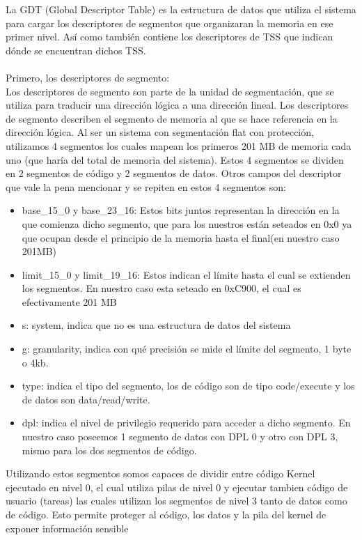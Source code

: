 La GDT (Global Descriptor Table) es la estructura de datos que utiliza el sistema para cargar los descriptores de segmentos que organizaran la memoria en ese primer nivel.
Así como también contiene los descriptores de TSS que indican dónde se encuentran dichos TSS.
\\\\
Primero, los descriptores de segmento: \\
Los descriptores de segmento son parte de la unidad de segmentación, que se utiliza para traducir una dirección lógica a una dirección lineal. Los descriptores de segmento describen el segmento de memoria al que se hace referencia en la dirección lógica.
Al ser un sistema con segmentación flat con protección, utilizamos 4 segmentos los cuales mapean los primeros 201 MB de memoria cada uno (que haría del total de memoria del sistema).
Estos 4 segmentos se dividen en 2 segmentos de código y 2 segmentos de datos.
Otros campos del descriptor que vale la pena mencionar y se repiten en estos 4 segmentos son:
\begin{itemize}
   \item base_15_0 y base_23_16: Estos bits juntos representan la dirección en la que comienza dicho segmento, que para los nuestros están seteados en 0x0 ya que ocupan desde el principio de la memoria hasta el final(en nuestro caso 201MB)
   \item limit_15_0 y limit_19_16: Estos indican el límite hasta el cual se extienden los segmentos. En nuestro caso esta seteado en 0xC900, el cual es efectivamente 201 MB
   \item s: system, indica que no es una estructura de datos del sistema
   \item g: granularity, indica con qué precisión se mide el límite del segmento, 1 byte o 4kb.
   \item type: indica el tipo del segmento, los de código son de tipo code/execute y los de datos son data/read/write.
   \item dpl: indica el nivel de privilegio requerido para acceder a dicho segmento. En nuestro caso poseemos 1 segmento de datos con DPL 0 y otro con DPL 3, mismo para los dos segmentos de código.
\end{itemize}
Utilizando estos segmentos somos capaces de dividir entre código Kernel ejecutado en nivel 0, el cual utiliza pilas de nivel 0 y ejecutar tambien código de usuario (tareas)
las cuales utilizan los segmentos de nivel 3 tanto de datos como de código. Esto permite proteger al código, los datos y la pila del kernel de exponer información sensible
